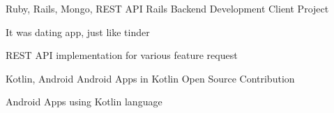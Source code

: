 \begin{cventries}
  \cventry
    {Ruby, Rails, Mongo, REST API} %
    {Rails Backend Development} %
    {Client Project} %
    {} %
    {
      \begin{cvitems} %
        \item {It was dating app, just like tinder}
        \item {REST API implementation for various feature request}
      \end{cvitems}
    }

  \cventry
    {Kotlin, Android} %
    {Android Apps in Kotlin} %
    {Open Source Contribution } %
    {} %
    {
      \begin{cvitems} %
        \item {Android Apps using Kotlin language}
      \end{cvitems}
    }







\end{cventries}
